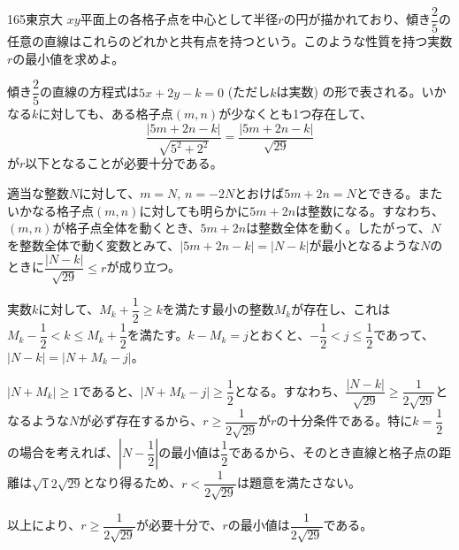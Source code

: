 \begin{prob}{165}{\maru}{東京大}
 $xy$平面上の各格子点を中心として半径$r$の円が描かれており、傾き$\dfrac{2}{5}$の任意の直線はこれらのどれかと共有点を持つという。このような性質を持つ実数$r$の最小値を求めよ。
\end{prob}
傾き$\dfrac{2}{5}$の直線の方程式は$5x+2y-k=0$ (ただし$k$は実数) の形で表される。いかなる$k$に対しても、ある格子点$(m, n)$が少なくとも1つ存在して、
\[ \frac{|5m+2n-k|}{\sqrt{5^2+2^2}}=\frac{|5m+2n-k|}{\sqrt{29}} \]
が$r$以下となることが必要十分である。

適当な整数$N$に対して、$m=N$, $n=-2N$とおけば$5m+2n=N$とできる。またいかなる格子点$(m, n)$に対しても明らかに$5m+2n$は整数になる。すなわち、$(m, n)$が格子点全体を動くとき、$5m+2n$は整数全体を動く。したがって、$N$を整数全体で動く変数とみて、$|5m+2n-k|=|N-k|$が最小となるような$N$のときに$\dfrac{|N-k|}{\sqrt{29}}\le r$が成り立つ。

実数$k$に対して、$M_k+\dfrac{1}{2}\ge k$を満たす最小の整数$M_k$が存在し、これは$M_k-\dfrac{1}{2}<k\le M_k+\dfrac{1}{2}$を満たす。$k-M_k=j$とおくと、$-\dfrac{1}{2}<j\le\dfrac{1}{2}$であって、$|N-k|=|N+M_k-j|$。

$|N+M_k|\ge 1$であると、$|N+M_k-j|\ge\dfrac{1}{2}$となる。すなわち、$\dfrac{|N-k|}{\sqrt{29}}\ge\dfrac{1}{2\sqrt{29}}$となるような$N$が必ず存在するから、$r\ge\dfrac{1}{2\sqrt{29}}$が$r$の十分条件である。特に$k=\dfrac{1}{2}$の場合を考えれば、$\left|N-\dfrac{1}{2}\right|$の最小値は$\dfrac{1}{2}$であるから、そのとき直線と格子点の距離は$\sqrt{1}{2\sqrt{29}}$となり得るため、$r<\dfrac{1}{2\sqrt{29}}$は題意を満たさない。

以上により、$r\ge\dfrac{1}{2\sqrt{29}}$が必要十分で、$r$の最小値は$\dfrac{1}{2\sqrt{29}}$である。